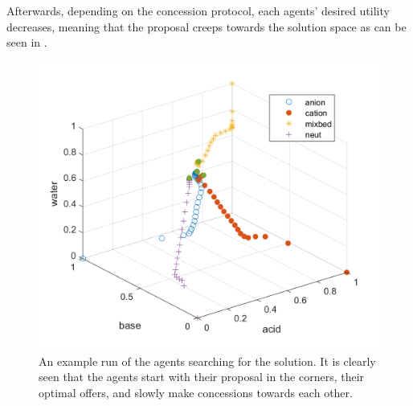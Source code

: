 Afterwards, depending on the concession protocol, each agents' desired utility decreases, meaning that the proposal creeps towards the solution space as can be seen in . 
\begin{figure}[h]
	\centering
	\includegraphics[width=0.7\linewidth]{img/searchforsolution}
	\caption{An example run of the agents searching for the solution. It is clearly seen that the agents start with their proposal in the corners, their optimal offers, and slowly make concessions towards each other.}
	\label{fig:searchforsolution}
\end{figure}

